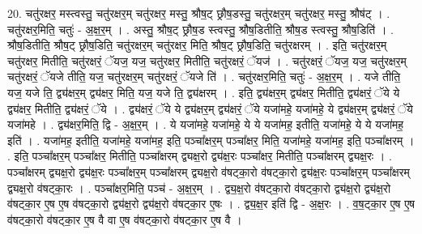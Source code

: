 \documentclass[17pt]{extarticle}
\begin{document}
20. चतु॑रक्षर॒ मस्त्वस्तु॒ चतु॑रक्षर॒म् चतु॑रक्षर॒ मस्तु॒ श्रौष॒ट् छ्रौष॒डस्तु॒ चतु॑रक्षर॒म् चतु॑रक्षर॒ मस्तु॒ श्रौष॑ट् । . चतु॑रक्षर॒मिति॒ चतुः॑ - अ॒क्ष॒र॒म् । . अस्तु॒ श्रौष॒ट् छ्रौष॒ड स्त्वस्तु॒ श्रौष॒डितीति॒ श्रौष॒ड स्त्वस्तु॒ श्रौष॒डिति॑ । . श्रौष॒डितीति॒ श्रौष॒ट् छ्रौष॒डिति॒ चतु॑रक्षर॒म् चतु॑रक्षर॒ मिति॒ श्रौष॒ट् छ्रौष॒डिति॒ चतु॑रक्षरम् । . इति॒ चतु॑रक्षर॒म् चतु॑रक्षर॒ मितीति॒ चतु॑रक्षरं॒ ॅयज॒ यज॒ चतु॑रक्षर॒ मितीति॒ चतु॑रक्षरं॒ ॅयज॑ । . चतु॑रक्षरं॒ ॅयज॒ यज॒ चतु॑रक्षर॒म् चतु॑रक्षरं॒ ॅयजे तीति॒ यज॒ चतु॑रक्षर॒म् चतु॑रक्षरं॒ ॅयजे ति॑ । . चतु॑रक्षर॒मिति॒ चतुः॑ - अ॒क्ष॒र॒म् । . यजे तीति॒ यज॒ यजे ति॒ द्व्य॑क्षर॒म् द्व्य॑क्षर॒ मिति॒ यज॒ यजे ति॒ द्व्य॑क्षरम् । . इति॒ द्व्य॑क्षर॒म् द्व्य॑क्षर॒ मितीति॒ द्व्य॑क्षरं॒ ॅये ये द्व्य॑क्षर॒ मितीति॒ द्व्य॑क्षरं॒ ॅये । . द्व्य॑क्षरं॒ ॅये ये द्व्य॑क्षर॒म् द्व्य॑क्षरं॒ ॅये यजा॑महे॒ यजा॑महे॒ ये द्व्य॑क्षर॒म् द्व्य॑क्षरं॒ ॅये यजा॑महे । . द्व्य॑क्षर॒मिति॒ द्वि - अ॒क्ष॒र॒म् । . ये यजा॑महे॒ यजा॑महे॒ ये ये यजा॑मह॒ इतीति॒ यजा॑महे॒ ये ये यजा॑मह॒ इति॑ । . यजा॑मह॒ इतीति॒ यजा॑महे॒ यजा॑मह॒ इति॒ पञ्चा᳚क्षर॒म् पञ्चा᳚क्षर॒ मिति॒ यजा॑महे॒ यजा॑मह॒ इति॒ पञ्चा᳚क्षरम् । . इति॒ पञ्चा᳚क्षर॒म् पञ्चा᳚क्षर॒ मितीति॒ पञ्चा᳚क्षरम् द्व्यक्ष॒रो द्व्य॑क्ष॒रः पञ्चा᳚क्षर॒ मितीति॒ पञ्चा᳚क्षरम् द्व्यक्ष॒रः । . पञ्चा᳚क्षरम् द्व्यक्ष॒रो द्व्य॑क्ष॒रः पञ्चा᳚क्षर॒म् पञ्चा᳚क्षरम् द्व्यक्ष॒रो व॑षट्का॒रो व॑षट्का॒रो द्व्य॑क्ष॒रः पञ्चा᳚क्षर॒म् पञ्चा᳚क्षरम् द्व्यक्ष॒रो व॑षट्का॒रः । . पञ्चा᳚क्षर॒मिति॒ पञ्च॑ - अ॒क्ष॒र॒म् । . द्व्य॒क्ष॒रो व॑षट्का॒रो व॑षट्का॒रो द्व्य॑क्ष॒रो द्व्य॑क्ष॒रो व॑षट्का॒र ए॒ष ए॒ष व॑षट्का॒रो द्व्य॑क्ष॒रो द्व्य॑क्ष॒रो व॑षट्का॒र ए॒षः । . द्व्य॒क्ष॒र इति॑ द्वि - अ॒क्ष॒रः । . व॒ष॒ट्का॒र ए॒ष ए॒ष व॑षट्का॒रो व॑षट्का॒र ए॒ष वै वा ए॒ष व॑षट्का॒रो व॑षट्का॒र ए॒ष वै । \newline
\end{document}
